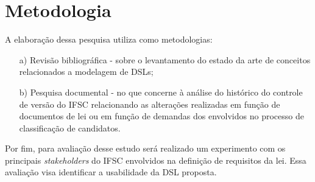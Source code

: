 \section{Metodologia}
\label{metodologia}

A elaboração dessa pesquisa utiliza como metodologias:

\begin{enumerate}
    \item[a)] Revisão bibliográfica - sobre o levantamento do estado da arte de conceitos relacionados a modelagem de \gls{DSL}s;
    
    \item[b)] Pesquisa documental - no que concerne à análise do histórico do controle de versão do \gls{IFSC} relacionando as alterações realizadas em função de documentos de lei ou em função de demandas dos envolvidos no processo de classificação de candidatos.
    
\end{enumerate}

Por fim, para avaliação desse estudo será realizado um experimento com os principais \textit{stakeholders} do IFSC envolvidos na definição de requisitos da lei. Essa avaliação visa identificar a usabilidade da \gls{DSL} proposta.
